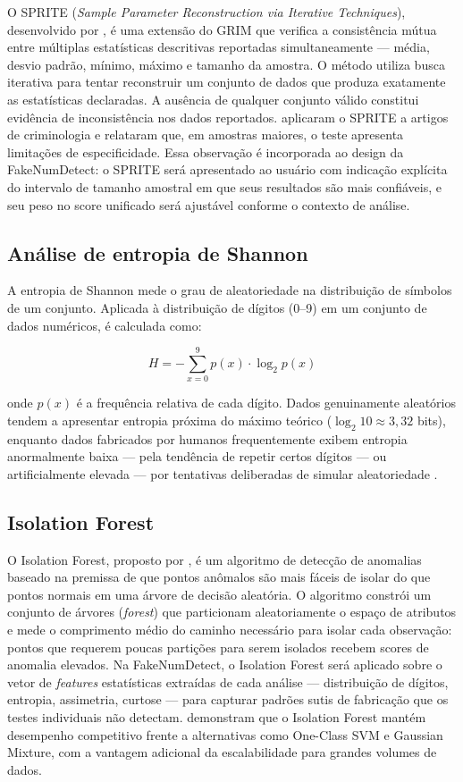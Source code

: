 \documentclass[
    12pt,                %
    openright,           %
    oneside,             %
    a4paper,             %
    english,             %
    brazil               %
]{abntex2}
\begin{document}
O SPRITE (\textit{Sample Parameter Reconstruction via Iterative Techniques}), desenvolvido por , é uma extensão do GRIM que verifica a consistência mútua entre múltiplas estatísticas descritivas reportadas simultaneamente — média, desvio padrão, mínimo, máximo e tamanho da amostra. O método utiliza busca iterativa para tentar reconstruir um conjunto de dados que produza exatamente as estatísticas declaradas. A ausência de qualquer conjunto válido constitui evidência de inconsistência nos dados reportados.
 aplicaram o SPRITE a artigos de criminologia e relataram que, em amostras maiores, o teste apresenta limitações de especificidade. Essa observação é incorporada ao design da FakeNumDetect: o SPRITE será apresentado ao usuário com indicação explícita do intervalo de tamanho amostral em que seus resultados são mais confiáveis, e seu peso no score unificado será ajustável conforme o contexto de análise.

\subsection{Análise de entropia de Shannon}
A entropia de Shannon \cite{Shannon1948} mede o grau de aleatoriedade na distribuição de símbolos de um conjunto. Aplicada à distribuição de dígitos (0--9) em um conjunto de dados numéricos, é calculada como:

\begin{equation}
    H = -\sum_{x=0}^{9} p(x) \cdot \log_2 p(x)
\end{equation}

onde \(p(x)\) é a frequência relativa de cada dígito. Dados genuinamente aleatórios tendem a apresentar entropia próxima do máximo teórico (\(\log_2 10 \approx 3{,}32\) bits), enquanto dados fabricados por humanos frequentemente exibem entropia anormalmente baixa — pela tendência de repetir certos dígitos — ou artificialmente elevada — por tentativas deliberadas de simular aleatoriedade \cite{Mosimann1995}.

\subsection{Isolation Forest}

O Isolation Forest, proposto por , é um algoritmo de detecção de anomalias baseado na premissa de que pontos anômalos são mais fáceis de isolar do que pontos normais em uma árvore de decisão aleatória. O algoritmo constrói um conjunto de árvores (\textit{forest}) que particionam aleatoriamente o espaço de atributos e mede o comprimento médio do caminho necessário para isolar cada observação: pontos que requerem poucas partições para serem isolados recebem scores de anomalia elevados.
Na FakeNumDetect, o Isolation Forest será aplicado sobre o vetor de \textit{features} estatísticas extraídas de cada análise — distribuição de dígitos, entropia, assimetria, curtose — para capturar padrões sutis de fabricação que os testes individuais não detectam.  demonstram que o Isolation Forest mantém desempenho competitivo frente a alternativas como One-Class SVM e Gaussian Mixture, com a vantagem adicional da escalabilidade para grandes volumes de dados.
\end{document}
